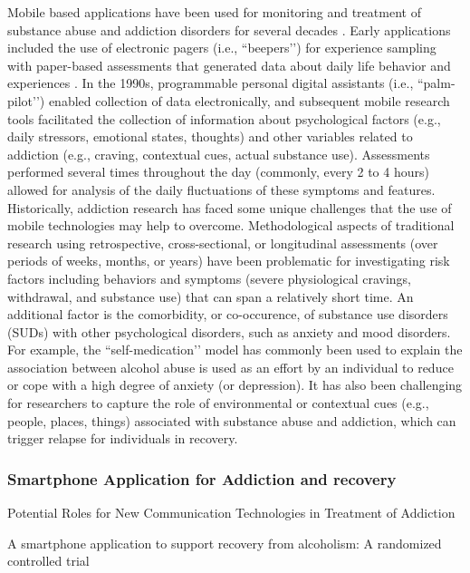 \documentclass[sigconf]{acmart}
\begin{document}
Mobile based applications have been used for monitoring and treatment of 
substance abuse and addiction disorders for several decades \cite{boyer10}. 
Early applications included the use of electronic pagers (i.e., ``beepers’’) 
for experience sampling with paper-based assessments that generated data about 
daily life behavior and experiences \cite{swedenson16}. In the 1990s, programmable 
personal digital assistants (i.e., ``palm-pilot’’) enabled collection of data 
electronically, and subsequent mobile research tools facilitated the collection 
of information about psychological factors (e.g., daily stressors, emotional 
states, thoughts) and other variables related to addiction (e.g., craving, 
contextual cues, actual substance use). Assessments performed several times 
throughout the day (commonly, every 2 to 4 hours) allowed for analysis of the 
daily fluctuations of these symptoms and features. Historically, addiction 
research has faced some unique challenges that the use of mobile technologies 
may help to overcome. Methodological aspects of traditional research using 
retrospective, cross-sectional, or longitudinal assessments (over periods of 
weeks, months, or years) have been problematic for investigating risk factors 
including behaviors and symptoms (severe physiological cravings, withdrawal, 
and substance use) that can span a relatively short time. An additional factor 
is the comorbidity, or co-occurence, of substance use disorders (SUDs) with other 
psychological disorders, such as anxiety and mood disorders. For example, the 
``self-medication’’ model has commonly been used to explain the association 
between alcohol abuse is used as an effort by an individual to reduce or cope 
with a high degree of anxiety (or depression). It has also been challenging 
for researchers to capture the role of environmental or contextual cues (e.g., 
people, places, things) associated with substance abuse and addiction, which 
can trigger relapse for individuals in recovery.


\subsubsection*{Smartphone Application for Addiction and recovery}


Potential Roles for New Communication Technologies in Treatment of Addiction 
\cite{johnson11}

A smartphone application to support recovery from alcoholism: 
A randomized controlled trial
\cite{gustafson14}
\end{document}
